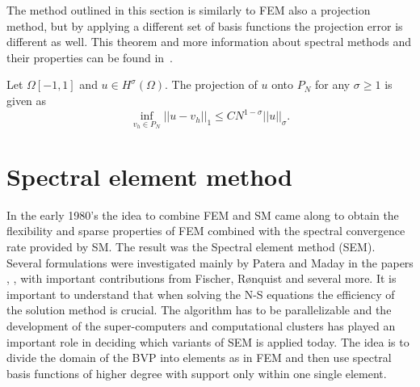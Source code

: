 The method outlined in this section is similarly to FEM also a projection method, 
but by applying a different set of basis functions the projection error is different 
as well. This theorem and more information about spectral methods and their properties can be 
found in~\cite{Canuto2007}.

\begin{theorem}
    Let $\Omega [-1,1]$ and  $u \in H^{\sigma}(\Omega)$. The projection 
    of $u$ onto $P_N$ for any $\sigma \ge 1$ is given as  
    \begin{equation}
        \inf_{v_h\in P_N}||u-v_h||_1 \le CN^{1-\sigma}||u||_{\sigma}.
    \end{equation}
    \label{thm:smconvergence}
\end{theorem}


\section{Spectral element method} \label{sem}
In the early 1980's the idea to combine FEM and SM came along to obtain the 
flexibility and sparse properties of FEM 
combined with the spectral convergence rate provided by SM. 
The result was the Spectral element method (SEM). Several formulations were investigated mainly by 
Patera and Maday in the papers \cite{maday1989}, \cite{Patera1984}, \cite{Patera1986} with 
important contributions from Fischer, Rønquist and several more.
It is important to understand that when solving the N-S equations the efficiency of the solution 
method is crucial. The algorithm has to be parallelizable and the development of the
super-computers and computational clusters has played an important role in 
deciding which variants of SEM is applied today. 
The idea is to divide the domain of the BVP into elements as in FEM and then use spectral basis 
functions of higher degree with support only within one single element. 


